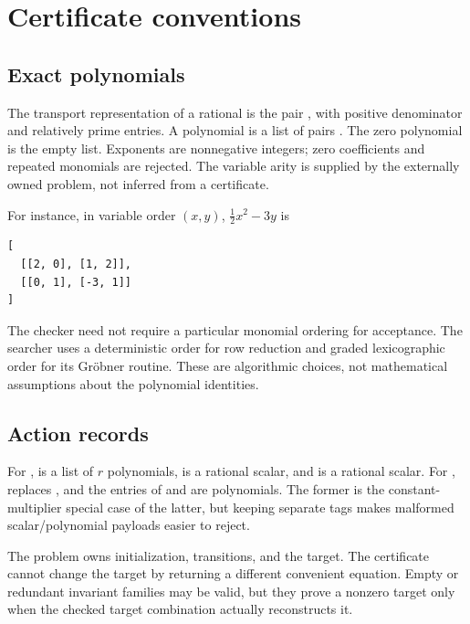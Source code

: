 \section{Certificate conventions}
\label{app:certificates}

\subsection{Exact polynomials}

The transport representation of a rational is the pair
, with positive denominator and relatively prime
entries. A polynomial is a list of pairs .
The zero polynomial is the empty list. Exponents are nonnegative integers;
zero coefficients and repeated monomials are rejected. The variable arity is
supplied by the externally owned problem, not inferred from a certificate.

For instance, in variable order $(x,y)$, $\tfrac12x^2-3y$ is
\begin{lstlisting}
[
  [[2, 0], [1, 2]],
  [[0, 1], [-3, 1]]
]
\end{lstlisting}
The checker need not require a particular monomial ordering for acceptance.
The searcher uses a deterministic order for row reduction and graded
lexicographic order for its Gr\"obner routine. These are algorithmic choices,
not mathematical assumptions about the polynomial identities.

\subsection{Action records}

For ,  is a list of $r$ polynomials,
 is a rational scalar, and
 is a rational scalar. For
,  replaces , and the
entries of  and  are polynomials.
The former is the constant-multiplier special case of the latter, but keeping
separate tags makes malformed scalar/polynomial payloads easier to reject.

The problem owns initialization, transitions, and the target. The certificate
cannot change the target by returning a different convenient equation. Empty
or redundant invariant families may be valid, but they prove a nonzero target
only when the checked target combination actually reconstructs it.

